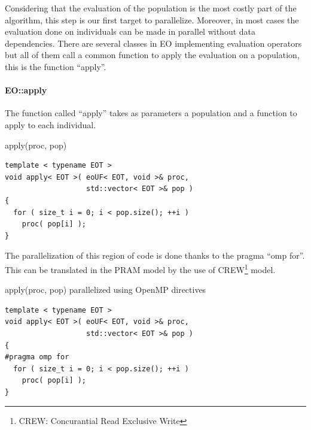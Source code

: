 \documentclass{sig-alternate}
\begin{document}
Considering that the evaluation of the population is the most costly part of the
algorithm, this step is our first target to parallelize. Moreover, in most cases
the evaluation done on individuals can be made in parallel without data
dependencies.  There are several classes in EO implementing evaluation operators
but all of them call a common function to apply the evaluation on a population,
this is the function ``apply''.

\paragraph{EO::apply} %
The function called ``apply'' takes as parameters a population and a function to apply to each individual.


\vspace{-0.2cm}
\begin{algorithm}[h!]
\caption{apply(proc, pop)}
\vspace{0.2cm}
\begin{verbatim}
template < typename EOT >
void apply< EOT >( eoUF< EOT, void >& proc,
                   std::vector< EOT >& pop )
{
  for ( size_t i = 0; i < pop.size(); ++i )
    proc( pop[i] );
}
\end{verbatim}
\end{algorithm}
\vspace{-0.2cm}


The parallelization of this region of code is done thanks to the pragma ``omp for''. This can be translated in the PRAM model by the use of CREW\footnote{CREW: Concurantial Read Exclusive Write} model.



\vspace{-0.2cm}
\begin{algorithm}[h!]
\caption{apply(proc, pop) parallelized using OpenMP directives}
\vspace{0.2cm}
\begin{verbatim}
template < typename EOT >
void apply< EOT >( eoUF< EOT, void >& proc,
                   std::vector< EOT >& pop )
{
#pragma omp for
  for ( size_t i = 0; i < pop.size(); ++i )
    proc( pop[i] );
}
\end{verbatim}
\end{algorithm}
\vspace{-0.2cm}
\end{document}
